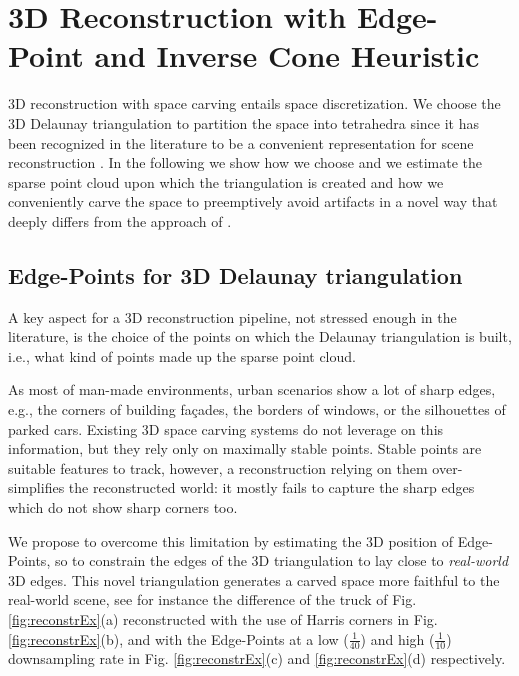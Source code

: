 \section{3D Reconstruction with Edge-Point and Inverse Cone Heuristic}
\label{sec:3D-Reconstruction}
3D reconstruction with space carving entails space discretization.
We choose the 3D Delaunay triangulation to partition the space into tetrahedra since it has been recognized in the literature to be a convenient representation for scene reconstruction \cite{litvinov_lhuillier_13, Pan_et_al09, labatut2007efficient, lovi_et_al_11}.
In the following we show how we choose and we estimate the sparse point cloud upon which the triangulation is created and how we conveniently carve the space to preemptively avoid artifacts in a novel way that deeply differs from the approach of \cite{litvinov_Lhiuller14}.

\subsection{Edge-Points for 3D Delaunay triangulation}
\label{subsec:pcl_estimation}
A key aspect for a 3D reconstruction pipeline, not stressed enough in the literature, is the choice of the points on which the Delaunay triangulation is built, i.e., what kind of points made up the sparse point cloud.

As most of man-made environments, urban scenarios show a lot of sharp edges, e.g., the corners of building fa\c{c}ades, the borders of windows, or the silhouettes of parked cars. Existing 3D space carving systems do not leverage on this information, but they rely only on maximally stable points.
Stable points are suitable features to track, however, a reconstruction relying on them over-simplifies the reconstructed world: it mostly fails to capture the sharp edges which do not show sharp corners too.

We propose to overcome this limitation by estimating the 3D position of Edge-Points, so to constrain the edges of the 3D triangulation to lay close to \emph{real-world} 3D edges. 
This novel triangulation generates a carved space more faithful to the real-world scene, see for instance the difference of the truck of Fig. \ref{fig:reconstrEx}(a) reconstructed with the use of Harris corners in Fig. \ref{fig:reconstrEx}(b), and with the Edge-Points at a low ($\frac{1}{40}$) and high ($\frac{1}{10}$) downsampling rate  in Fig. \ref{fig:reconstrEx}(c) and \ref{fig:reconstrEx}(d) respectively. 

